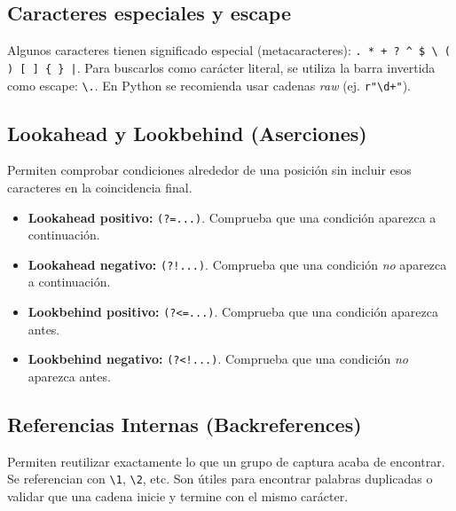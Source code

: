 \documentclass[12pt]{article}
\begin{document}
{\subsection{Caracteres especiales y escape}
Algunos caracteres tienen significado especial (metacaracteres): \texttt{. * + ? \^{} \$ \textbackslash{} ( ) [ ] \{ \} |}. Para buscarlos como carácter literal, se utiliza la barra invertida como escape: \texttt{\textbackslash .}. En Python se recomienda usar cadenas \textit{raw} (ej. \texttt{r"\textbackslash d+"}).

\subsection{Lookahead y Lookbehind (Aserciones)}
Permiten comprobar condiciones alrededor de una posición sin incluir esos caracteres en la coincidencia final.
\begin{itemize}
\item \textbf{Lookahead positivo:} \texttt{(?=...)}. Comprueba que una condición aparezca a continuación.
\item \textbf{Lookahead negativo:} \texttt{(?!...)}. Comprueba que una condición \textit{no} aparezca a continuación.
\item \textbf{Lookbehind positivo:} \texttt{(?\textless=...)}. Comprueba que una condición aparezca antes.
\item \textbf{Lookbehind negativo:} \texttt{(?\textless!...)}. Comprueba que una condición \textit{no} aparezca antes.
\end{itemize}

\subsection{Referencias Internas (Backreferences)}
Permiten reutilizar exactamente lo que un grupo de captura acaba de encontrar. Se referencian con \texttt{\textbackslash 1}, \texttt{\textbackslash 2}, etc. Son útiles para encontrar palabras duplicadas o validar que una cadena inicie y termine con el mismo carácter.

}
\end{document}
